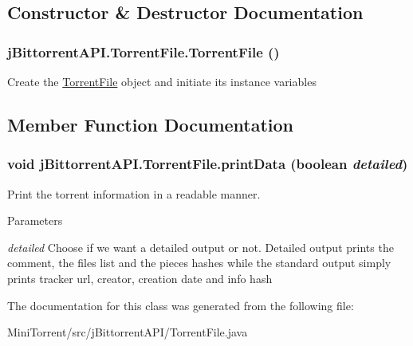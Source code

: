 \subsection{Constructor \& Destructor Documentation}
\hypertarget{classj_bittorrent_a_p_i_1_1_torrent_file_aac2b828978bc931932146200e5ec55b9}{
\subsubsection[{TorrentFile}]{\setlength{\rightskip}{0pt plus 5cm}jBittorrentAPI.TorrentFile.TorrentFile ()}}
\label{classj_bittorrent_a_p_i_1_1_torrent_file_aac2b828978bc931932146200e5ec55b9}
Create the \hyperlink{classj_bittorrent_a_p_i_1_1_torrent_file}{TorrentFile} object and initiate its instance variables 

\subsection{Member Function Documentation}
\hypertarget{classj_bittorrent_a_p_i_1_1_torrent_file_a3d7505b0e8df0b65154df45e277b400c}{
\subsubsection[{printData}]{\setlength{\rightskip}{0pt plus 5cm}void jBittorrentAPI.TorrentFile.printData (boolean {\em detailed})}}
\label{classj_bittorrent_a_p_i_1_1_torrent_file_a3d7505b0e8df0b65154df45e277b400c}
Print the torrent information in a readable manner. 
\begin{DoxyParams}{Parameters}
\item[{\em detailed}]Choose if we want a detailed output or not. Detailed output prints the comment, the files list and the pieces hashes while the standard output simply prints tracker url, creator, creation date and info hash \end{DoxyParams}


The documentation for this class was generated from the following file:\begin{DoxyCompactItemize}
\item 
MiniTorrent/src/jBittorrentAPI/TorrentFile.java\end{DoxyCompactItemize}
